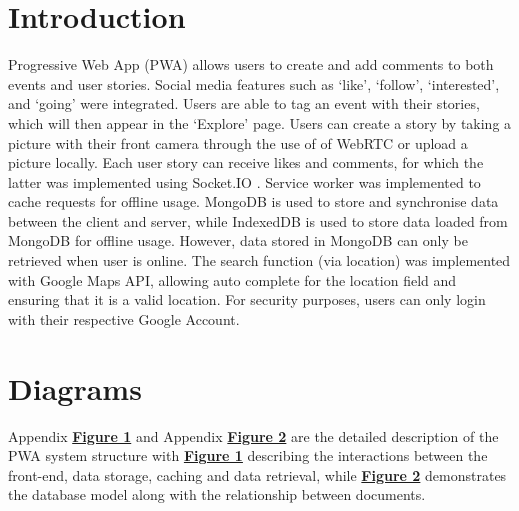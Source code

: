 \documentclass[11pt, a4paper]{article}
\begin{document}
\section{Introduction}
Progressive Web App (PWA) allows users to create and add comments to both events and user stories.
Social media features such as `like', `follow', `interested', and `going' were integrated. Users are
able to tag an event with their stories, which will then appear in the `Explore' page. Users can
create a story by taking a picture with their front camera through the use of
of WebRTC or upload a picture locally. Each user story can receive likes and comments, for which
the latter was implemented using Socket.IO \cite{week6, socketio}. Service worker was implemented
to cache requests for offline usage. MongoDB is used to store and synchronise data between the
client and server, while IndexedDB is used to store data loaded from MongoDB for offline usage.
However, data stored in MongoDB can only be retrieved when user is online. The search function (via
location) was implemented with Google Maps API, allowing auto complete for the location field and
ensuring that it is a valid location. For security purposes, users can only login with their
respective Google Account.

\section{Diagrams}
Appendix \hyperref[figure:site_map]{\textbf{Figure 1}} and Appendix \hyperref[figure:uml]{
\textbf{Figure 2}} are the detailed description of the PWA system structure with
\hyperref[figure:site_map]{\textbf{Figure 1}} describing the interactions between the front-end,
data storage, caching and data retrieval, while \hyperref[figure:uml]{\textbf{Figure 2}}
demonstrates the database model along with the relationship between documents.
\end{document}
